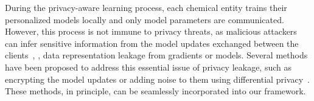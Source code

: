 During the privacy-aware learning process, each chemical entity trains their personalized models locally and only model parameters are communicated. However, this process is not immune to privacy threats, as malicious attackers can infer sensitive information from the model updates exchanged between the clients~\citep{xie2019dba,lyu2022privacy}, \ie, data representation leakage from gradients or models. Several methods have been proposed to address this essential issue of privacy leakage, such as encrypting the model updates or adding noise to them using differential privacy~\citep{abadi2016deep,sun2021provable}.  These methods, in principle, can be seamlessly incorporated into our framework.
